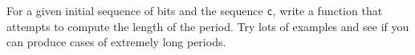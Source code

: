   For a given initial sequence of bits and the sequence \verb!c!,
  write a function that attempts to compute the length of the
  period.
  Try lots of examples and see if you can produce cases of
  extremely long periods.

